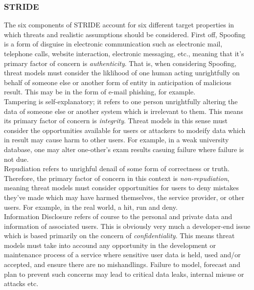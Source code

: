 \documentclass[11pt, english]{article}
\begin{document}
		\subsubsection{STRIDE}

	The six components of STRIDE account for six different target properties in which threats and realistic assumptions should be considered. First off, Spoofing is a form of disguise in electronic communication such as electronic mail, telephone calls, website interaction, electronic messaging, etc., meaning that it's primary factor of concern is \textit{authenticity}. That is, when considering Spoofing, threat models must consider the liklihood of one human acting unrightfully on behalf of someone else or another form of entity in anticipation of malicious result. This may be in the form of e-mail phishing, for example.\\

	Tampering is self-explanatory; it refers to one person unrightfully altering the data of someone else or another system which is irrelevant to them. This means its primary factor of concern is \textit{integrity}. Threat models in this sense must consider the opportunities available for users or attackers to modeify data which in result may cause harm to other users. For example, in a weak university database, one may alter one-other's exam results casuing failure where failure is not due.\\

	Repudiation refers to unrighful denail of some form of correctness or truth. Therefore, the primary factor of concern in this context is \textit{non-repudiation}, meaning threat models must consider opportunities for users to deny mistakes they've made which may have harmed themselves, the service provider, or other users. For example, in the real world, a hit, run and deny.\\

	Information Disclosure refers of course to the personal and private data and information of associated users. This is obviously very much a developer-end issue which is based primarily on the concern of \textit{confidentiality}. This means threat models must take into accound any opportunity in the development or maintenance process of a service where sensitive user data is held, used and/or accepted, and ensure there are no mishandlings. Failure to model, forecast and plan to prevent such concerns may lead to critical data leaks, internal misuse or attacks etc.\\
\end{document}
